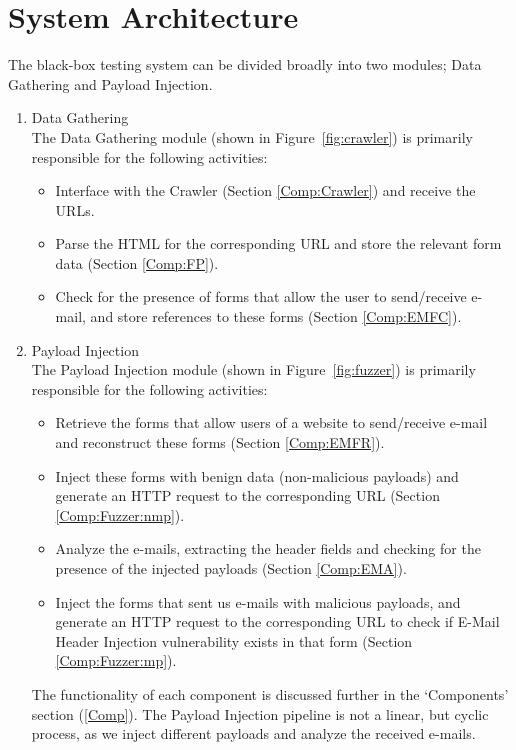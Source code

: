 \section{System Architecture}
\label{sys:arch}
The black-box testing system can be divided broadly into two modules; Data Gathering and Payload Injection.
\begin{enumerate}
	\item Data Gathering\\
	The Data Gathering module (shown in Figure~\ref{fig:crawler}) is primarily responsible for the following activities:
	\begin{itemize}
		\item Interface with the Crawler (Section \ref{Comp:Crawler}) and receive the URLs.
		\item Parse the HTML for the corresponding URL and store the relevant form data (Section \ref{Comp:FP}).
		\item Check for the presence of forms that allow the user to send/receive e-mail, and store references to these forms (Section \ref{Comp:EMFC}).
	\end{itemize} 
	\item Payload Injection\\
	The Payload Injection module (shown in Figure~\ref{fig:fuzzer}) is primarily responsible for the following activities:
	\begin{itemize}
		\item Retrieve the forms that allow users of a website to send/receive e-mail and reconstruct these forms (Section \ref{Comp:EMFR}).
		\item Inject these forms with benign data (non-malicious payloads) and generate an HTTP request to the corresponding URL (Section \ref{Comp:Fuzzer:nmp}).
		\item Analyze the e-mails, extracting the header fields and checking for the presence of the injected payloads (Section \ref{Comp:EMA}).
		\item Inject the forms that sent us e-mails with malicious payloads, and generate an HTTP request to the corresponding URL to check if E-Mail Header Injection vulnerability exists in that form (Section \ref{Comp:Fuzzer:mp}).
	\end{itemize} 
	The functionality of each component is discussed further in the `Components' section (\ref{Comp}). The Payload Injection pipeline is not a linear, but cyclic process, as we inject different payloads and analyze the received e-mails.
\end{enumerate}

